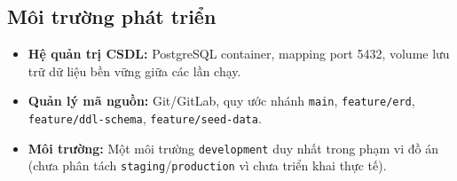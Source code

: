 \subsection{Môi trường phát triển}
\begin{itemize}
    \item \textbf{Hệ quản trị CSDL:} PostgreSQL container, mapping port 5432, volume lưu trữ dữ liệu bền vững giữa các lần chạy.
    \item \textbf{Quản lý mã nguồn:} Git/GitLab, quy ước nhánh \texttt{main}, \texttt{feature/erd}, \texttt{feature/ddl-schema}, \texttt{feature/seed-data}.
    \item \textbf{Môi trường:} Một môi trường \texttt{development} duy nhất trong phạm vi đồ án (chưa phân tách \texttt{staging}/\texttt{production} vì chưa triển khai thực tế).
\end{itemize}
